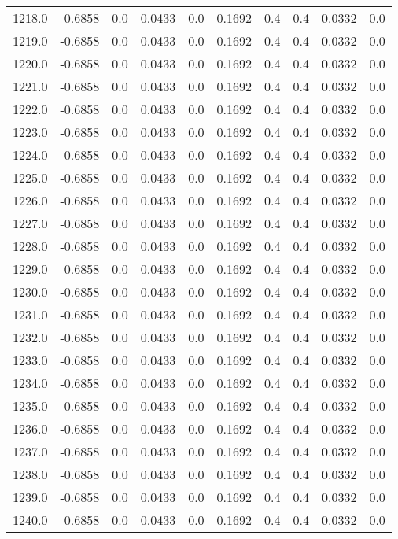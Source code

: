 \begin{longtable}{lrrrrrrrrr}
1218.0 & -0.6858 & 0.0 & 0.0433 & 0.0 & 0.1692 & 0.4 & 0.4 & 0.0332 & 0.0 \\
1219.0 & -0.6858 & 0.0 & 0.0433 & 0.0 & 0.1692 & 0.4 & 0.4 & 0.0332 & 0.0 \\
1220.0 & -0.6858 & 0.0 & 0.0433 & 0.0 & 0.1692 & 0.4 & 0.4 & 0.0332 & 0.0 \\
1221.0 & -0.6858 & 0.0 & 0.0433 & 0.0 & 0.1692 & 0.4 & 0.4 & 0.0332 & 0.0 \\
1222.0 & -0.6858 & 0.0 & 0.0433 & 0.0 & 0.1692 & 0.4 & 0.4 & 0.0332 & 0.0 \\
1223.0 & -0.6858 & 0.0 & 0.0433 & 0.0 & 0.1692 & 0.4 & 0.4 & 0.0332 & 0.0 \\
1224.0 & -0.6858 & 0.0 & 0.0433 & 0.0 & 0.1692 & 0.4 & 0.4 & 0.0332 & 0.0 \\
1225.0 & -0.6858 & 0.0 & 0.0433 & 0.0 & 0.1692 & 0.4 & 0.4 & 0.0332 & 0.0 \\
1226.0 & -0.6858 & 0.0 & 0.0433 & 0.0 & 0.1692 & 0.4 & 0.4 & 0.0332 & 0.0 \\
1227.0 & -0.6858 & 0.0 & 0.0433 & 0.0 & 0.1692 & 0.4 & 0.4 & 0.0332 & 0.0 \\
1228.0 & -0.6858 & 0.0 & 0.0433 & 0.0 & 0.1692 & 0.4 & 0.4 & 0.0332 & 0.0 \\
1229.0 & -0.6858 & 0.0 & 0.0433 & 0.0 & 0.1692 & 0.4 & 0.4 & 0.0332 & 0.0 \\
1230.0 & -0.6858 & 0.0 & 0.0433 & 0.0 & 0.1692 & 0.4 & 0.4 & 0.0332 & 0.0 \\
1231.0 & -0.6858 & 0.0 & 0.0433 & 0.0 & 0.1692 & 0.4 & 0.4 & 0.0332 & 0.0 \\
1232.0 & -0.6858 & 0.0 & 0.0433 & 0.0 & 0.1692 & 0.4 & 0.4 & 0.0332 & 0.0 \\
1233.0 & -0.6858 & 0.0 & 0.0433 & 0.0 & 0.1692 & 0.4 & 0.4 & 0.0332 & 0.0 \\
1234.0 & -0.6858 & 0.0 & 0.0433 & 0.0 & 0.1692 & 0.4 & 0.4 & 0.0332 & 0.0 \\
1235.0 & -0.6858 & 0.0 & 0.0433 & 0.0 & 0.1692 & 0.4 & 0.4 & 0.0332 & 0.0 \\
1236.0 & -0.6858 & 0.0 & 0.0433 & 0.0 & 0.1692 & 0.4 & 0.4 & 0.0332 & 0.0 \\
1237.0 & -0.6858 & 0.0 & 0.0433 & 0.0 & 0.1692 & 0.4 & 0.4 & 0.0332 & 0.0 \\
1238.0 & -0.6858 & 0.0 & 0.0433 & 0.0 & 0.1692 & 0.4 & 0.4 & 0.0332 & 0.0 \\
1239.0 & -0.6858 & 0.0 & 0.0433 & 0.0 & 0.1692 & 0.4 & 0.4 & 0.0332 & 0.0 \\
1240.0 & -0.6858 & 0.0 & 0.0433 & 0.0 & 0.1692 & 0.4 & 0.4 & 0.0332 & 0.0 \\

\end{longtable}
